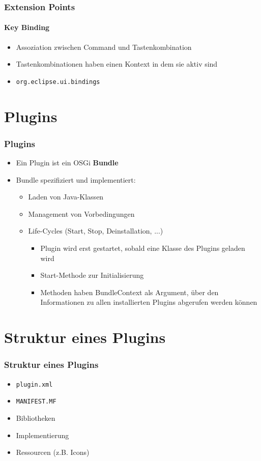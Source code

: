{\begin{frame}
  \frametitle{Extension Points}
  \framesubtitle{Key Binding}
  \begin{itemize}
    \item Assoziation zwischen Command und Tastenkombination
    \item Tastenkombinationen haben einen Kontext in dem sie aktiv sind
    \item \texttt{org.eclipse.ui.bindings}
  \end{itemize}
\end{frame}

\section{Plugins}
\begin{frame}
	\frametitle{Plugins}
	\begin{itemize}
		\item Ein Plugin ist ein OSGi \textbf{Bundle}
		\item Bundle spezifiziert und implementiert:
		\begin{itemize}
			\item Laden von Java-Klassen
			\item Management von Vorbedingungen
			\item Life-Cycles (Start, Stop, Deinstallation, ...)
			\begin{itemize}
				\item Plugin wird erst gestartet, sobald eine Klasse des Plugins geladen wird
				\item Start-Methode zur Initialisierung
				\item Methoden haben BundleContext als Argument, über den Informationen zu allen installierten Plugins abgerufen werden können
			\end{itemize}
		\end{itemize}
	\end{itemize}
\end{frame}

\section{Struktur eines Plugins}
\begin{frame}
  \frametitle{Struktur eines Plugins}
  \begin{itemize}
  \item \texttt{plugin.xml}
  \item \texttt{MANIFEST.MF}
  \item Bibliotheken
  \item Implementierung
  \item Ressourcen (z.B. Icons)
  \end{itemize}
\end{frame}

}
